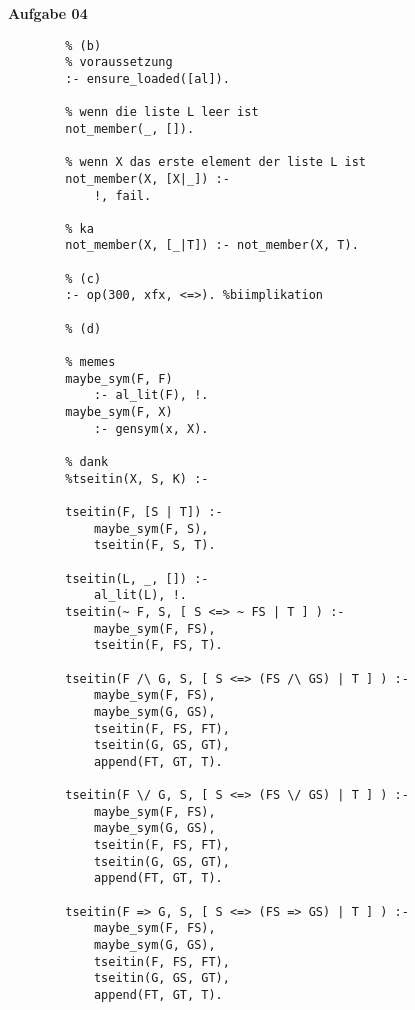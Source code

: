 \documentclass[a4paper,10pt]{article}
\begin{document}
	\textbf{Aufgabe 04}
	\begin{compactenum} [a)]
		\item
		\item \begin{verbatim}
		% (b)
		% voraussetzung
		:- ensure_loaded([al]).

		% wenn die liste L leer ist
		not_member(_, []).

		% wenn X das erste element der liste L ist
		not_member(X, [X|_]) :-
			!, fail.

		% ka
		not_member(X, [_|T]) :- not_member(X, T).

		% (c)
		:- op(300, xfx, <=>). %biimplikation

		% (d)

		% memes
		maybe_sym(F, F)
			:- al_lit(F), !.
		maybe_sym(F, X)
			:- gensym(x, X).

		% dank
		%tseitin(X, S, K) :-

		tseitin(F, [S | T]) :-
			maybe_sym(F, S),
			tseitin(F, S, T).

		tseitin(L, _, []) :-
			al_lit(L), !.
		tseitin(~ F, S, [ S <=> ~ FS | T ] ) :-
			maybe_sym(F, FS),
			tseitin(F, FS, T).

		tseitin(F /\ G, S, [ S <=> (FS /\ GS) | T ] ) :-
			maybe_sym(F, FS),
			maybe_sym(G, GS),
			tseitin(F, FS, FT),
			tseitin(G, GS, GT),
			append(FT, GT, T).

		tseitin(F \/ G, S, [ S <=> (FS \/ GS) | T ] ) :-
			maybe_sym(F, FS),
			maybe_sym(G, GS),
			tseitin(F, FS, FT),
			tseitin(G, GS, GT),
			append(FT, GT, T).

		tseitin(F => G, S, [ S <=> (FS => GS) | T ] ) :-
			maybe_sym(F, FS),
			maybe_sym(G, GS),
			tseitin(F, FS, FT),
			tseitin(G, GS, GT),
			append(FT, GT, T).
		\end{verbatim}
		\item \begin{verbatim}
		\end{verbatim}
		\item \begin{verbatim}
		\end{verbatim}
		\end{compactenum}
\end{document}
